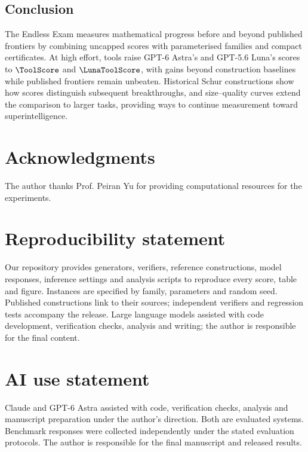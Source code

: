 \documentclass{article}
\begin{document}
\begin{samepage}
\section{Conclusion}
The Endless Exam measures mathematical progress before and beyond published frontiers by combining uncapped scores with parameterised families and compact certificates. At high effort, tools raise GPT-6 Astra's and GPT-5.6 Luna's scores to $\ToolScore$ and $\LunaToolScore$, with gains beyond construction baselines while published frontiers remain unbeaten. Historical Schur constructions show how scores distinguish subsequent breakthroughs, and size--quality curves extend the comparison to larger tasks, providing ways to continue measurement toward superintelligence.
\par
\label{page:mainend}
\end{samepage}

\clearpage
\ifdefined\EndlessExamPreprint
\section*{Acknowledgments}
The author thanks Prof. Peiran Yu for providing computational resources for the experiments.
\fi

\section*{Reproducibility statement}
Our repository provides generators, verifiers, reference constructions, model responses, inference settings and analysis scripts to reproduce every score, table and figure. Instances are specified by family, parameters and random seed. Published constructions link to their sources; independent verifiers and regression tests accompany the release.
\ifdefined\EndlessExamPreprint
Large language models assisted with code development, verification checks, analysis and writing; the author is responsible for the final content.
\else
\section*{AI use statement}
Claude and GPT-6 Astra assisted with code, verification checks, analysis and manuscript preparation under the author's direction. Both are evaluated systems. Benchmark responses were collected independently under the stated evaluation protocols. The author is responsible for the final manuscript and released results.
\fi




\clearpage
\appendix

\end{document}
